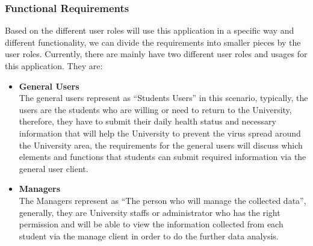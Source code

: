 \documentclass[12pt]{article}
\begin{document}
\subsubsection{Functional Requirements}
Based on the different user roles will use this application in a specific way and different functionality, we can divide the requirements into smaller pieces by the user roles. Currently, there are mainly have two different user roles and usages for this application. They are:
\begin{itemize}
\item\textbf{General Users}
\\The general users represent as ``Students Users'' in this scenario, typically, the users are the students who are willing or need to return to the University, therefore, they have to submit their daily health status and necessary information that will help the University to prevent the virus spread around the University area, the requirements for the general users will discuss which elements and functions that students can submit required information via the general user client.
\item\textbf{Managers}
\\The Managers represent as ``The person who will manage the collected data'', generally, they are University staffs or administrator who has the right permission and will be able to view the information collected from each student via the manage client in order to do the further data analysis.
\end{itemize}
\end{document}
